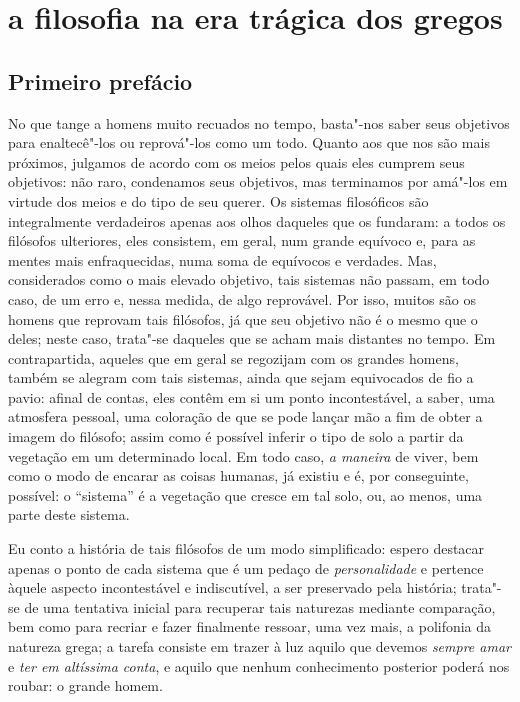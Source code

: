 \part{a filosofia na era trágica dos gregos}

\chapter{Primeiro prefácio}

No que tange a homens muito recuados no tempo, basta"-nos saber seus
 objetivos para enaltecê"-los ou reprová"-los como um todo. Quanto aos que
 nos são mais próximos, julgamos de acordo com os meios pelos quais eles
 cumprem seus objetivos: não raro, condenamos seus objetivos, mas terminamos
 por amá"-los em virtude dos meios e do tipo de seu querer. Os sistemas
 filosóficos são integralmente verdadeiros apenas aos olhos daqueles que os
 fundaram: a todos os filósofos ulteriores, eles consistem, em geral, num
 grande equívoco e, para as mentes mais enfraquecidas, numa soma de equívocos
 e verdades. Mas, considerados como o mais elevado objetivo, tais sistemas
 não passam, em todo caso, de um erro e, nessa medida, de algo reprovável.
 Por isso, muitos são os homens que reprovam tais filósofos, já que seu
 objetivo não é o mesmo que o deles; neste caso, trata"-se daqueles que se
 acham mais distantes no tempo. Em contrapartida, aqueles que em geral se
 regozijam com os grandes homens, também se alegram com tais sistemas, ainda
 que sejam equivocados de fio a pavio: afinal de contas, eles contêm em si um
 ponto incontestável, a saber, uma atmosfera pessoal, uma coloração \label{atmosferapessoal} 
 de que se pode lançar mão a fim de obter a imagem do
 filósofo; assim como é possível inferir o tipo de solo a partir da vegetação
 em um determinado local. \label{possivelinferir} Em todo caso, \textit{a maneira} 
 de viver, bem como o modo de encarar as coisas \label{amaneirade} 
 humanas, já existiu e é, por conseguinte, possível: o
 ``sistema'' é a vegetação que cresce em tal solo, ou, ao menos, uma parte
 deste sistema. 

Eu conto a história de tais filósofos de um modo simplificado: espero
destacar \label{simplificado} apenas o ponto de cada sistema que é um pedaço
de
\textit{personalidade} e pertence àquele aspecto incontestável e indiscutível,
 a ser preservado pela história; trata"-se de uma tentativa inicial para
 recuperar tais naturezas mediante \label{comparacao} comparação, bem como
 para recriar e fazer finalmente ressoar, uma vez mais, a polifonia da
 natureza grega; a tarefa consiste em trazer à luz aquilo que devemos \textit{sempre amar} e 
 \textit{ter em altíssima conta}, e aquilo que nenhum
 conhecimento posterior poderá nos roubar: o \label{ograndehomem} grande
 homem.


